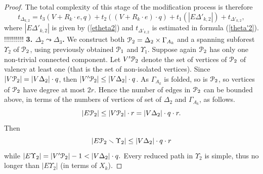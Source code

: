 \documentclass[a4paper,12pt]{article}
\newcommand{\G}{\Gamma }
\newcommand{\D}{\Delta }
\newcommand{\T}{\Theta }
\newcommand{\U}{\Upsilon }
\newcommand{\cP}{{\cal{P}}}
\numberwithin{equation}{section}
\numberwithin{figure}{section}
\begin{document}
\begin{proof}
The total complexity of this stage of the modification process is
therefore
\begin{equation}\label{theta2}
t_{\D_{k,2}} = t_3(V + R_k \cdot e, q) + t_2((V + R_k \cdot e) \cdot
q)+ t_1(|E\D'_{k,2}|) + t_{\D'_{k,2}},
\end{equation}
where $|E\D'_{k,2}|$ is given by (\ref{etheta2}) and $t_{\D'_{k,2}}$ is
estimated in formula (\ref{theta'2}).
!!!!!!!!!!
{\bf 3. $\D_2 \leadsto \D_3$.} We construct both $\cP_2=\D_2\times \G_{A_k}$ and a spanning
subforest $\U_2$ of $\cP_2$, using previously obtained $\cP_1$ and $\U_1$. Suppose again
$\cP_2$ has only one non-trivial connected component.
 Let $V'\cP_2$ denote the set of vertices of $\cP_2$ of valency at least one
(that is the set of non-isolated vertices). Since $|V\cP_2|=|V\D_2|\cdot q$, then $|V'\cP_2|
\le |V\D_2|\cdot q$. As $\G_{A_k}$ is folded, so is $\cP_2$, so
vertices of $\cP_2$ have degree at most $2r$. Hence the number of
edges in $\cP_2$ can be bounded above, in terms of the numbers of
vertices of set of $\D_2$ and $\G_{A_k}$, as follows.
\[ |E\cP_2| \le |V\cP_2|\cdot r =|V\D_2|\cdot q \cdot r.\]
Then
\[|E\cP_2\smallsetminus \U_2| \le |V\D_2|\cdot q \cdot r\]
while $|E \U_2| = |V'\cP_2| - 1 < |V\D_2|\cdot q.$ Every reduced
path in $\U_2$ is simple, thus no longer than $|E\U_2|$ (in terms
of $X_k$).


\end{proof}
\end{document}
